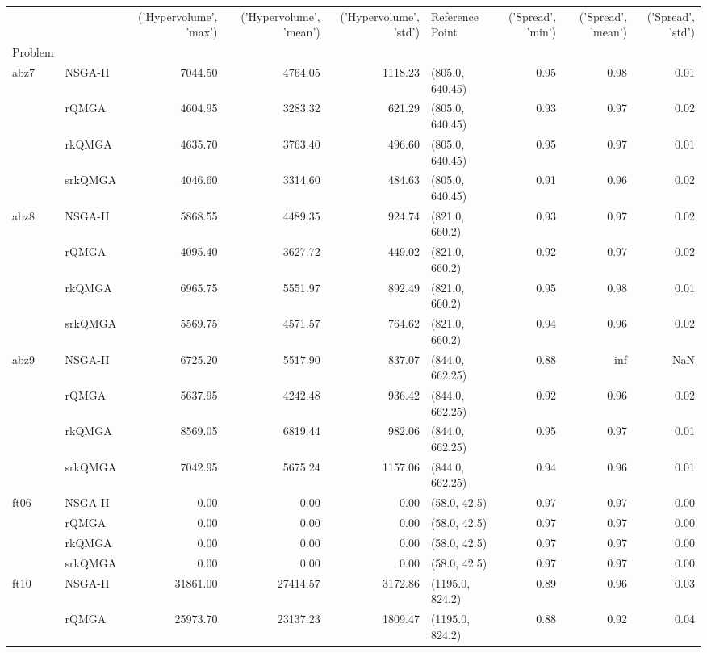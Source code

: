 \begin{tabular}{llrrrlrrr}
\toprule
 &  & ('Hypervolume', 'max') & ('Hypervolume', 'mean') & ('Hypervolume', 'std') & Reference Point & ('Spread', 'min') & ('Spread', 'mean') & ('Spread', 'std') \\
Problem &  &  &  &  &  &  &  &  \\
\midrule
\multirow[t]{4}{*}{abz7} & NSGA-II & 7044.50 & 4764.05 & 1118.23 & (805.0, 640.45) & 0.95 & 0.98 & 0.01 \\
 & rQMGA & 4604.95 & 3283.32 & 621.29 & (805.0, 640.45) & 0.93 & 0.97 & 0.02 \\
 & rkQMGA & 4635.70 & 3763.40 & 496.60 & (805.0, 640.45) & 0.95 & 0.97 & 0.01 \\
 & srkQMGA & 4046.60 & 3314.60 & 484.63 & (805.0, 640.45) & 0.91 & 0.96 & 0.02 \\
\cline{1-9}
\multirow[t]{4}{*}{abz8} & NSGA-II & 5868.55 & 4489.35 & 924.74 & (821.0, 660.2) & 0.93 & 0.97 & 0.02 \\
 & rQMGA & 4095.40 & 3627.72 & 449.02 & (821.0, 660.2) & 0.92 & 0.97 & 0.02 \\
 & rkQMGA & 6965.75 & 5551.97 & 892.49 & (821.0, 660.2) & 0.95 & 0.98 & 0.01 \\
 & srkQMGA & 5569.75 & 4571.57 & 764.62 & (821.0, 660.2) & 0.94 & 0.96 & 0.02 \\
\cline{1-9}
\multirow[t]{4}{*}{abz9} & NSGA-II & 6725.20 & 5517.90 & 837.07 & (844.0, 662.25) & 0.88 & inf & NaN \\
 & rQMGA & 5637.95 & 4242.48 & 936.42 & (844.0, 662.25) & 0.92 & 0.96 & 0.02 \\
 & rkQMGA & 8569.05 & 6819.44 & 982.06 & (844.0, 662.25) & 0.95 & 0.97 & 0.01 \\
 & srkQMGA & 7042.95 & 5675.24 & 1157.06 & (844.0, 662.25) & 0.94 & 0.96 & 0.01 \\
\cline{1-9}
\multirow[t]{4}{*}{ft06} & NSGA-II & 0.00 & 0.00 & 0.00 & (58.0, 42.5) & 0.97 & 0.97 & 0.00 \\
 & rQMGA & 0.00 & 0.00 & 0.00 & (58.0, 42.5) & 0.97 & 0.97 & 0.00 \\
 & rkQMGA & 0.00 & 0.00 & 0.00 & (58.0, 42.5) & 0.97 & 0.97 & 0.00 \\
 & srkQMGA & 0.00 & 0.00 & 0.00 & (58.0, 42.5) & 0.97 & 0.97 & 0.00 \\
\cline{1-9}
\multirow[t]{4}{*}{ft10} & NSGA-II & 31861.00 & 27414.57 & 3172.86 & (1195.0, 824.2) & 0.89 & 0.96 & 0.03 \\
 & rQMGA & 25973.70 & 23137.23 & 1809.47 & (1195.0, 824.2) & 0.88 & 0.92 & 0.04 \\

\end{tabular}
